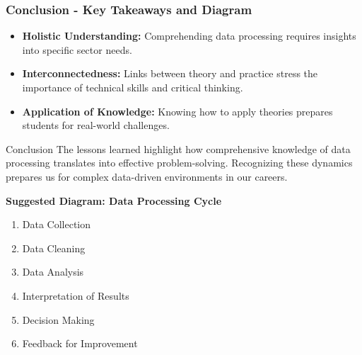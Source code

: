 \documentclass[aspectratio=169]{beamer}
\begin{document}
\begin{frame}[fragile]
    \frametitle{Conclusion - Key Takeaways and Diagram}
    \begin{itemize}
        \item \textbf{Holistic Understanding:} Comprehending data processing requires insights into specific sector needs.
        \item \textbf{Interconnectedness:} Links between theory and practice stress the importance of technical skills and critical thinking.
        \item \textbf{Application of Knowledge:} Knowing how to apply theories prepares students for real-world challenges.
    \end{itemize}

    \begin{block}{Conclusion}
        The lessons learned highlight how comprehensive knowledge of data processing translates into effective problem-solving. Recognizing these dynamics prepares us for complex data-driven environments in our careers.
    \end{block}
    
    \textbf{Suggested Diagram: Data Processing Cycle}
    \begin{enumerate}
        \item Data Collection
        \item Data Cleaning
        \item Data Analysis
        \item Interpretation of Results
        \item Decision Making
        \item Feedback for Improvement
    \end{enumerate}
\end{frame}
\end{document}
